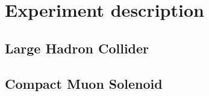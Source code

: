 \chapter{Experiment description\label{sec:experiment}}

\section{Large Hadron Collider\label{sec:lhc}}

\section{Compact Muon Solenoid\label{sec:cms}}
